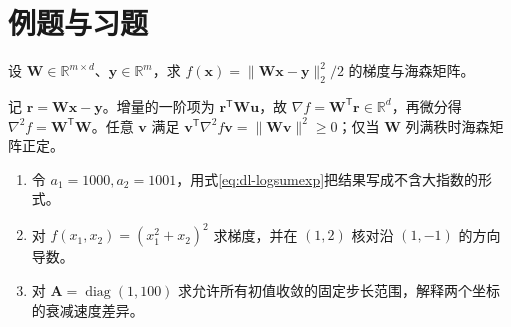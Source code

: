 \section{例题与习题}
\begin{example}[平方损失的矩阵梯度]
设 $\mathbf W\in\mathbb R^{m\times d}$、$\mathbf y\in\mathbb R^m$，求 $f(\mathbf x)=\|\mathbf W\mathbf x-\mathbf y\|_2^2/2$ 的梯度与海森矩阵。
\end{example}
\begin{solve}
记 $\mathbf r=\mathbf W\mathbf x-\mathbf y$。增量的一阶项为 $\mathbf r^\mathsf T\mathbf W\mathbf u$，故 $\nabla f=\mathbf W^\mathsf T\mathbf r\in\mathbb R^d$，再微分得 $\nabla^2f=\mathbf W^\mathsf T\mathbf W$。任意 $\mathbf v$ 满足 $\mathbf v^\mathsf T\nabla^2f\mathbf v=\|\mathbf W\mathbf v\|^2\geq0$；仅当 $\mathbf W$ 列满秩时海森矩阵正定。
\end{solve}
\begin{enumerate}
\item 令 $a_1=1000,a_2=1001$，用式\eqref{eq:dl-logsumexp}把结果写成不含大指数的形式。
\item 对 $f(x_1,x_2)=(x_1^2+x_2)^2$ 求梯度，并在 $(1,2)$ 核对沿 $(1,-1)$ 的方向导数。
\item 对 $\mathbf A=\operatorname{diag}(1,100)$ 求允许所有初值收敛的固定步长范围，解释两个坐标的衰减速度差异。
\end{enumerate}

